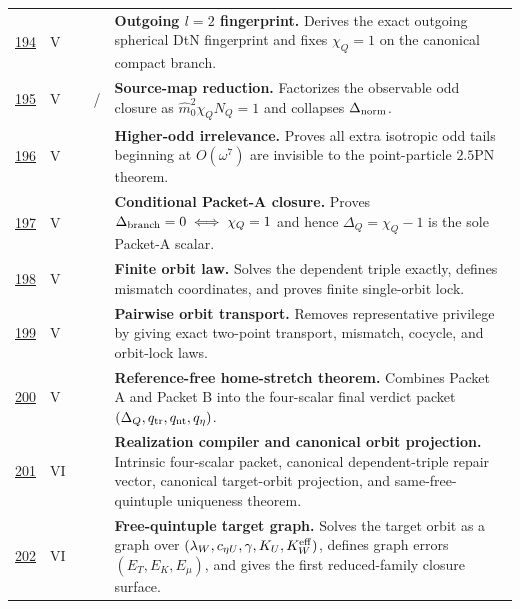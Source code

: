 {\begin{longtable}{@{}L{0.055\textwidth}L{0.075\textwidth}L{0.145\textwidth}L{0.235\textwidth}L{0.43\textwidth}@{}}
\addlinespace
\hyperref[stage:194]{194} & V &  & \StatusExactClosure{} & \textbf{Outgoing \(l=2\) fingerprint.} Derives the exact outgoing spherical DtN fingerprint and fixes \(\chi_Q=1\) on the canonical compact branch. \\
\addlinespace
\hyperref[stage:195]{195} & V &  & \StatusExactClosure{} / \StatusReduced{} & \textbf{Source-map reduction.} Factorizes the observable odd closure as \(\widehat m_0^{2}\chi_QN_Q=1\) and collapses \(\Delta_{\rm norm}\). \\
\addlinespace
\hyperref[stage:196]{196} & V &  & \StatusExactClosure{} & \textbf{Higher-odd irrelevance.} Proves all extra isotropic odd tails beginning at \(O(\omega^7)\) are invisible to the point-particle \(2.5\)PN theorem. \\
\addlinespace
\hyperref[stage:197]{197} & V &  & \StatusExactClosure{} & \textbf{Conditional Packet-A closure.} Proves \(\Delta_{\rm branch}=0\iff \chi_Q=1\) and hence \(\Delta_Q=\chi_Q-1\) is the sole Packet-A scalar. \\
\addlinespace
\hyperref[stage:198]{198} & V &  & \StatusExactClosure{} & \textbf{Finite orbit law.} Solves the dependent triple exactly, defines mismatch coordinates, and proves finite single-orbit lock. \\
\addlinespace
\hyperref[stage:199]{199} & V &  & \StatusExactClosure{} & \textbf{Pairwise orbit transport.} Removes representative privilege by giving exact two-point transport, mismatch, cocycle, and orbit-lock laws. \\
\addlinespace
\hyperref[stage:200]{200} & V &  & \StatusExactClosure{} & \textbf{Reference-free home-stretch theorem.} Combines Packet A and Packet B into the four-scalar final verdict packet \((\Delta_Q,q_{\rm tr},q_{\rm nt},q_\eta)\). \\
\addlinespace
\hyperref[stage:201]{201} & VI &  & \StatusExactClosure{} & \textbf{Realization compiler and canonical orbit projection.} Intrinsic four-scalar packet, canonical dependent-triple repair vector, canonical target-orbit projection, and same-free-quintuple uniqueness theorem. \\
\addlinespace
\hyperref[stage:202]{202} & VI &  & \StatusExactClosure{} & \textbf{Free-quintuple target graph.} Solves the target orbit as a graph over \((\lambda_W,c_{\eta U},\gamma,K_U,K_W^{\rm eff})\), defines graph errors \((E_T,E_K,E_\mu)\), and gives the first reduced-family closure surface. \\

\end{longtable}}

